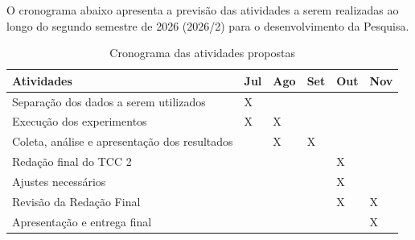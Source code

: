 O cronograma abaixo apresenta a previsão das atividades a serem realizadas ao longo
do segundo semestre de 2026 (2026/2) para o desenvolvimento da Pesquisa.

\begin{table}[H]
\centering
\begin{tabular}{  |>{\centering\arraybackslash}p{7cm}|>{\centering\arraybackslash}p{1cm}|>{\centering\arraybackslash}p{1cm}|>{\centering\arraybackslash}p{1cm}|>{\centering\arraybackslash}p{1cm}|>{\centering\arraybackslash}p{1cm}| }
\hline
\textbf{Atividades} & \textbf{Jul} & \textbf{Ago} & \textbf{Set} & \textbf{Out} & \textbf{Nov}\\
\hline
Separação dos dados a serem utilizados & X &  &  &  &  \\
\hline
Execução dos experimentos & X & X &  &  &  \\
\hline
Coleta, análise e apresentação dos resultados & & X & X  &  &  \\
\hline
Redação final do TCC 2 & &  &   & X &  \\
\hline
Ajustes necessários  & &  &   & X &  \\
\hline
Revisão da Redação Final & &  &   & X & X  \\
\hline
Apresentação e entrega final  & &  &   &  & X  \\
\hline
\end{tabular}
\caption{Cronograma das atividades propostas}
\label{tab:PHP}
\end{table}



